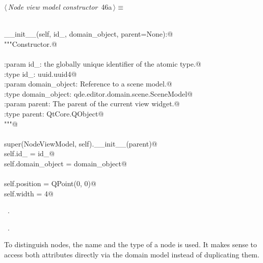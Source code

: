 \documentclass[
    a4paper,      %
    10pt,         %
    openright,    %
    notitlepage,  %
    parskip=half, %
]{scrreprt}       %
\theoremstyle{definition}                    %
\begin{document}
\begin{flushleft} \small
\begin{minipage}{\linewidth}\label{scrap60}\raggedright\small
{} $\langle\,${\itshape Node view model constructor}\nobreak\ {\footnotesize {46a}}$\,\rangle\equiv$
\vspace{-1ex}
\begin{list}{}{} \item
\mbox{}\lstinline@@\\
\mbox{}\lstinline@def __init__(self, id_, domain_object, parent=None):@\\
\mbox{}\lstinline@    """Constructor.@\\
\mbox{}\lstinline@@\\
\mbox{}\lstinline@    :param id_: the globally unique identifier of the atomic type.@\\
\mbox{}\lstinline@    :type  id_: uuid.uuid4@\\
\mbox{}\lstinline@    :param domain_object: Reference to a scene model.@\\
\mbox{}\lstinline@    :type  domain_object: qde.editor.domain.scene.SceneModel@\\
\mbox{}\lstinline@    :param parent: The parent of the current view widget.@\\
\mbox{}\lstinline@    :type parent:  QtCore.QObject@\\
\mbox{}\lstinline@    """@\\
\mbox{}\lstinline@@\\
\mbox{}\lstinline@    super(NodeViewModel, self).__init__(parent)@\\
\mbox{}\lstinline@    self.id_ = id_@\\
\mbox{}\lstinline@    self.domain_object = domain_object@\\
\mbox{}\lstinline@@\\
\mbox{}\lstinline@    self.position = QPoint(0, 0)@\\
\mbox{}\lstinline@    self.width = 4@\\
\mbox{}\lstinline@@{\NWsep}
\end{list}
\vspace{-1.5ex}
\footnotesize
\begin{list}{}{\setlength{\itemsep}{-\parsep}\setlength{\itemindent}{-\leftmargin}}
\item \NWtxtMacroDefBy\ .
\item \NWtxtMacroRefIn\ .

\item{}
\end{list}
\end{minipage}\vspace{4ex}
\end{flushleft}
To distinguish nodes, the name and the type of a node is used. It makes sense to
access both attributes directly via the domain model instead of duplicating them.
\end{document}
